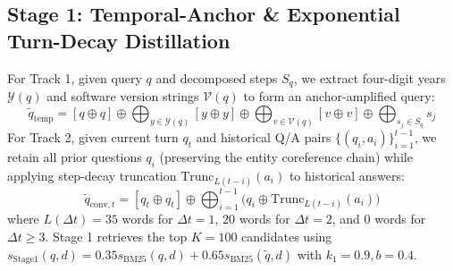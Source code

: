 \documentclass[10pt,twocolumn]{article}
\begin{document}
\subsection{Stage 1: Temporal-Anchor \& Exponential Turn-Decay Distillation}
For Track 1, given query $q$ and decomposed steps $S_q$, we extract four-digit years $\mathcal{Y}(q)$ and software version strings $\mathcal{V}(q)$ to form an anchor-amplified query:
\begin{equation}
\tilde{q}_{\text{temp}} = [q \oplus q] \oplus \bigoplus_{y \in \mathcal{Y}(q)} [y \oplus y] \oplus \bigoplus_{v \in \mathcal{V}(q)} [v \oplus v] \oplus \bigoplus_{s_j \in S_q} s_j
\end{equation}
For Track 2, given current turn $q_t$ and historical Q/A pairs $\{(q_i, a_i)\}_{i=1}^{t-1}$, we retain all prior questions $q_i$ (preserving the entity coreference chain) while applying step-decay truncation $\text{Trunc}_{L(t-i)}(a_i)$ to historical answers:
\begin{equation}
\tilde{q}_{\text{conv}, t} = [q_t \oplus q_t] \oplus \bigoplus_{i=1}^{t-1} \Big( q_i \oplus \text{Trunc}_{L(t-i)}(a_i) \Big)
\end{equation}
where $L(\Delta t) = 35$ words for $\Delta t=1$, $20$ words for $\Delta t=2$, and $0$ words for $\Delta t \ge 3$. Stage 1 retrieves the top $K=100$ candidates using $s_{\text{Stage1}}(q, d) = 0.35 s_{\text{BM25}}(q, d) + 0.65 s_{\text{BM25}}(\tilde{q}, d)$ with $k_1=0.9, b=0.4$.
\end{document}
